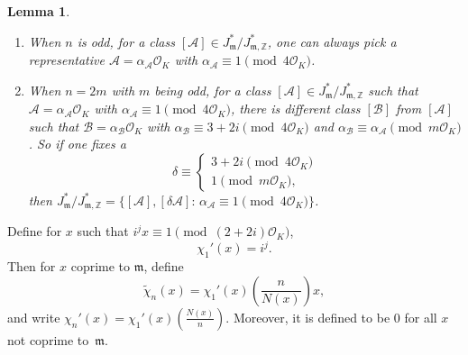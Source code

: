 \documentclass[11pt, reqno]{amsart}
\theoremstyle{plain}
\newtheorem{lemma}[theorem]{Lemma}
\theoremstyle{definition}
\numberwithin{equation}{section}
\begin{document}
\begin{lemma}\label{lemalpha}
\begin{enumerate}
    \item When $n$ is odd,  for a class $[\mathcal{A}]\in J_{\mathfrak{m}}^{*}/J_{\mathfrak{m},\mathbb{Z}}^{*}$, one can always pick a representative $\mathcal{A}=\alpha_{\mathcal{A}}\mathcal{O}_{K}$ with $\alpha_{\mathcal{A}}\equiv1\pmod{4\mathcal{O}_{K}}$.

   \item  When $n=2m$ with $m$ being odd, for a class $[\mathcal{A}]\in J_{\mathfrak{m}}^{*}/J_{\mathfrak{m},\mathbb{Z}}^{*}$ such that  $\mathcal{A}=\alpha_{\mathcal{A}}\mathcal{O}_{K}$ with $\alpha_{\mathcal{A}}\equiv1\pmod{4\mathcal{O}_{K}}$, there is different class $[\mathcal{B}]$ from $[\mathcal{A}]$ such that $\mathcal{B}=\alpha_{\mathcal{B}}\mathcal{O}_{K}$ with $\alpha_{\mathcal{B}}\equiv3+2i\pmod{4\mathcal{O}_{K}}$ and $\alpha_{\mathcal{B}}\equiv \alpha_{\mathcal{A}}\pmod{m\mathcal{O}_{K}}$. So if one fixes a 
    $$
    \delta\equiv\begin{cases}
        3+2i\pmod{4\mathcal{O}_{K}}\\
        1\pmod{m\mathcal{O}_{K}},
    \end{cases}
    $$
    then $J_{\mathfrak{m}}^{*}/J_{\mathfrak{m},\mathbb{Z}}^{*}=\{[\mathcal{A}],[\delta\mathcal{A}]:\, \alpha_{\mathcal{A}}\equiv1\pmod{4\mathcal{O}_{K}}\}$.
 \end{enumerate}
   
\end{lemma}



Define for  $x$  such that $i^{j}x\equiv1\pmod{(2+2i)\mathcal{O}_{K}}$, 
$$
\chi_{1}'(x)=i^{j}.
$$
Then for   $x$ coprime to $\mathfrak{m}$, define
$$
\tilde{\chi}_{n}(x)=\chi_{1}'(x)\left(\frac{n}{N(x)}\right)x,
$$
and write $\chi_{n}'(x)=\chi_{1}'(x)\left(\frac{N(x)}{n}\right)$.
Moreover,  it is defined to be $0$ for all $x$      not
 coprime to~$\mathfrak{m}$. 
\end{document}
